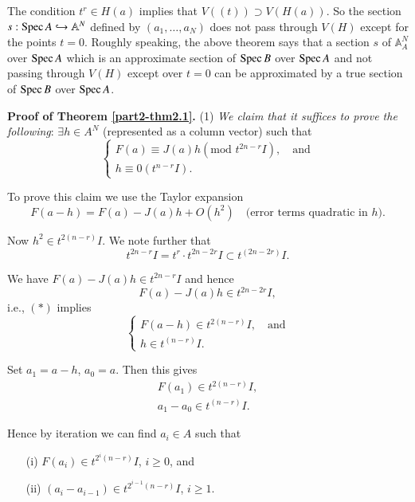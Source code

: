 \begin{remark}\label{part2-rem2.1}
The condition $t^{r}\in H(a)$ implies that $V((t))\supset V(H(a))$. So
the section $s:\operatorname{Spec} A\hookrightarrow \mathbb{A}^{N}$ defined by
$(a_{1},\ldots,a_{N})$ does not pass through $V(H)$ except for the
points $t=0$. Roughly speaking, the above theorem says that a section
$s$ of $\mathbb{A}^{N}_{A}$ over $\operatorname{Spec} A$ which is an approximate
section of $\operatorname{Spec} B$ over $\operatorname{Spec} A$ and not passing through $V(H)$
except over $t=0$ can be approximated by a true section of $\operatorname{Spec} B$
over $\operatorname{Spec} A$.
\end{remark}

\noindent
{\bf Proof of Theorem \ref{part2-thm2.1}.} (1) {\em We claim that it
  suffices to prove the  following}: $\exists h\in A^{N}$ (represented
as a column vector) such that 
\begin{equation*}
\begin{cases}
F(a)\equiv J(a)h(\text{mod~}t^{2n-r}I),\quad\text{and}\\
h\equiv 0(t^{n-r}I).
\end{cases}\tag{*}
\end{equation*}\pageoriginale

To prove this claim we use the Taylor expansion
$$
F(a-h)=F(a)-J(a)h+O(h^{2})\quad\text{(error terms quadratic in $h$)}.
$$

Now $h^{2}\in t^{2(n-r)}I$. We note further that
$$
t^{2n-r}I=t^{r}\cdot t^{2n-2r}I\subset t^{(2n-2r)}I. 
$$

We have $F(a)-J(a)h\in t^{2n-r}I$ and hence
$$
F(a)-J(a)h\in t^{2n-2r}I,
$$
i.e., $(*)$ implies
$$
\begin{cases}
F(a-h)\in t^{2(n-r)}I,\quad\text{and}\\
h\in t^{(n-r)}I.
\end{cases}
$$

Set $a_{1}=a-h$, $a_{0}=a$. Then this gives
\begin{gather*}
F(a_{1})\in t^{2(n-r)}I,\\
a_{1}-a_{0}\in t^{(n-r)}I.
\end{gather*}

Hence by iteration we can find $a_{i}\in A$ such that
\begin{itemize}
\item[(i)] $F(a_{i})\in t^{2^{i}(n-r)}I$, $i\geq 0$, and

\item[(ii)] $(a_{i}-a_{i-1})\in t^{2^{i-1}(n-r)}I$, $i\geq 1$.
\end{itemize}

